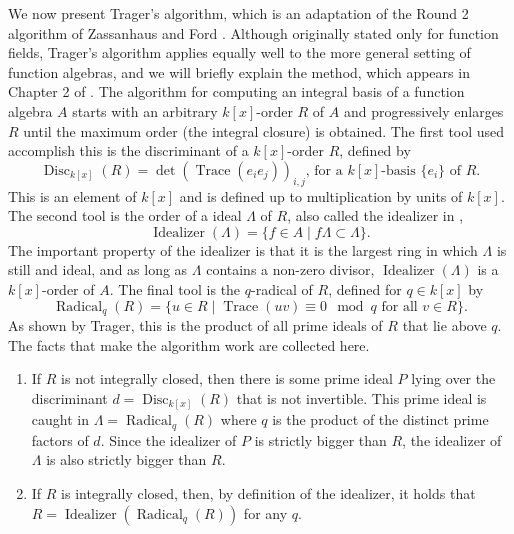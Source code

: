 \documentclass[12pt,reqno]{amsart}
\numberwithin{equation}{section}
\newcommand{\op}[1]  { \operatorname{ #1 }}
\begin{document}
We now present Trager's algorithm, which is an adaptation of the Round 2 algorithm of Zassanhaus and Ford \cite{ford}. Although originally stated only for function fields, Trager's algorithm applies equally well to the more general setting of function algebras, and we will briefly explain the method, which appears in Chapter 2 of \cite{trager}. The algorithm for computing an integral basis of a function algebra $A$ starts with an arbitrary $k[x]$-order $R$ of $A$ and progressively enlarges $R$ until the maximum order (the integral closure) is obtained. The first tool used accomplish this is the discriminant of a $k[x]$-order $R$, defined by
\begin{equation*}
 \op{Disc}_{k[x]}(R) = \det{ (\op{Trace}(e_i e_j))_{i,j}}\text{, for a $k[x]$-basis $\{e_i\}$ of $R$.}
\end{equation*}
This is an element of $k[x]$ and is defined up to multiplication by units of $k[x]$. The second tool is the order of a ideal $\Lambda$ of $R$, also called the idealizer in \cite{trager},
\begin{equation*}
 \op{Idealizer}(\Lambda) = \{ f \in A \mid f \Lambda \subset \Lambda \}\text{.}
\end{equation*}
The important property of the idealizer is that it is the largest ring in which $\Lambda$ is still and ideal, and as long as $\Lambda$ contains a non-zero divisor, $\op{Idealizer}(\Lambda)$ is a $k[x]$-order of $A$. The final tool is the $q$-radical of $R$, defined for $q \in k[x]$ by
\begin{equation*}
 \op{Radical}_{q}(R) = \{ u \in R \mid \op{Trace}(u v) \equiv 0 \mod q \text{ for all } v \in R\}\text{.}
\end{equation*}
As shown by Trager, this is the product of all prime ideals of $R$ that lie above $q$. The facts that make the algorithm work are collected here.
\begin{enumerate}
 \item If $R$ is not integrally closed, then there is some prime ideal $P$ lying over the discriminant $d=\op{Disc}_{k[x]}(R)$ that is not invertible. This prime ideal is caught in $\Lambda=\op{Radical}_{q}(R)$ where $q$ is the product of the distinct prime factors of $d$. Since the idealizer of $P$ is strictly bigger than $R$, the idealizer of $\Lambda$ is also strictly bigger than $R$.
 \item If $R$ is integrally closed, then, by definition of the idealizer, it holds that $R=\op{Idealizer}(\op{Radical}_{q}(R))$ for any $q$.
\end{enumerate}
\end{document}
